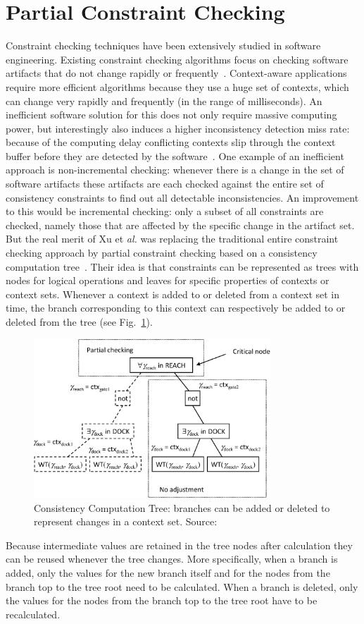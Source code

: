 \documentclass[journal]{vgtc}                %
\begin{document}
\section{Partial Constraint Checking}
Constraint checking techniques have been extensively studied in software engineering. Existing constraint checking algorithms focus on checking software artifacts that do not change rapidly or frequently~\cite{xu:2010:PCC}. Context-aware applications require more efficient algorithms because they use a huge set of contexts, which can change very rapidly and frequently (in the range of milliseconds). An inefficient software solution for this does not only require massive computing power, but interestingly also induces a higher inconsistency detection miss rate: because of the computing delay conflicting contexts slip through the context buffer before they are detected by the software~\cite{xu:2010:PCC}. One example of an inefficient approach is non-incremental checking: whenever there is a change in the set of software artifacts these artifacts are each checked against the entire set of consistency constraints to find out all detectable inconsistencies. An improvement to this would be incremental checking: only a subset of all constraints are checked, namely those that are affected by the specific change in the artifact set. But the real merit of Xu et \textit{al.} was replacing the traditional entire constraint checking approach by partial constraint checking based on a consistency computation tree~\cite{xu:2010:PCC}. Their idea is that constraints can be represented as trees with nodes for logical operations and leaves for specific properties of contexts or context sets. Whenever a context is added to or deleted from a context set in time, the branch corresponding to this context can respectively be added to or deleted from the tree (see Fig.~\ref{fig:cct}). 
\begin{figure}[htb]
  \centering
  \includegraphics[width=3.5in]{cons_comp_tree}
  \caption{Consistency Computation Tree: branches can be added or deleted to represent changes in a context set. Source:~\cite{xu:2010:PCC}}
  \label{fig:cct}
\end{figure}
Because intermediate values are retained in the tree nodes after calculation they can be reused whenever the tree changes. More specifically, when a branch is added, only the values for the new branch itself and for the nodes from the branch top to the tree root need to be calculated. When a branch is deleted, only the values for the nodes from the branch top to the tree root have to be recalculated. 
\end{document}
